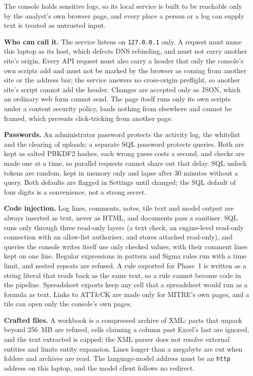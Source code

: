 \documentclass[11pt,a4paper]{article}
\begin{document}
The console holds sensitive logs, so its local service is built to be reachable only by the analyst's own browser page, and every place a person or a log can supply text is treated as untrusted input.

\textbf{Who can call it.} The service listens on \nolinkurl{127.0.0.1} only. A request must name this laptop as its host, which defeats DNS rebinding, and must not carry another site's origin. Every API request must also carry a header that only the console's own scripts add and must not be marked by the browser as coming from another site or the address bar; the service answers no cross-origin preflight, so another site's script cannot add the header. Changes are accepted only as JSON, which an ordinary web form cannot send. The page itself runs only its own scripts under a content security policy, loads nothing from elsewhere and cannot be framed, which prevents click-tricking from another page.

\textbf{Passwords.} An administrator password protects the activity log, the whitelist and the clearing of uploads; a separate SQL password protects queries. Both are kept as salted PBKDF2 hashes, each wrong guess costs a second, and checks are made one at a time, so parallel requests cannot share out that delay. SQL unlock tokens are random, kept in memory only and lapse after 30 minutes without a query. Both defaults are flagged in Settings until changed; the SQL default of four digits is a convenience, not a strong secret.

\textbf{Code injection.} Log lines, comments, notes, tile text and model output are always inserted as text, never as HTML, and documents pass a sanitiser. SQL runs only through three read-only layers (a text check, an engine-level read-only connection with an allow-list authoriser, and stores attached read-only), and queries the console writes itself use only checked values, with their comment lines kept on one line. Regular expressions in pattern and Sigma rules run with a time limit, and nested repeats are refused. A rule exported for Phase~1 is written as a string literal that reads back as the same text, so a rule cannot become code in the pipeline. Spreadsheet exports keep any cell that a spreadsheet would run as a formula as text. Links to ATT\&CK are made only for MITRE's own pages, and a tile can open only the console's own pages.

\textbf{Crafted files.} A workbook is a compressed archive of XML: parts that unpack beyond 256~MB are refused, cells claiming a column past Excel's last are ignored, and the text extracted is capped; the XML parser does not resolve external entities and limits entity expansion. Lines longer than a megabyte are cut when folders and archives are read. The language-model address must be an \nolinkurl{http} address on this laptop, and the model client follows no redirect.
\end{document}
